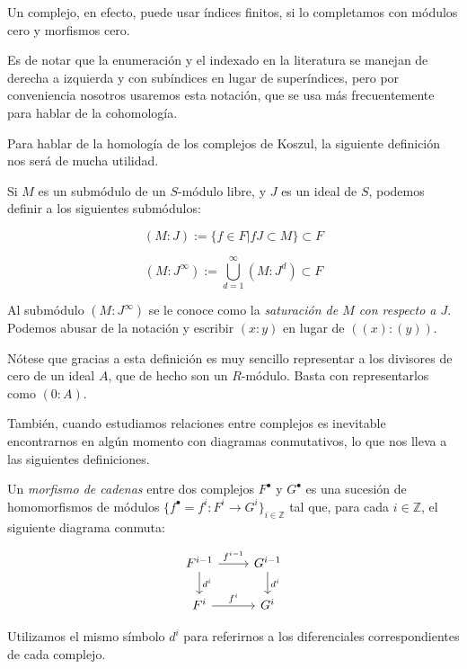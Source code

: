 Un complejo, en efecto, puede usar índices finitos, si lo completamos con módulos cero y morfismos cero.

Es de notar que la enumeración y el indexado en la literatura se manejan de derecha a izquierda y con subíndices en lugar de superíndices, pero por conveniencia nosotros usaremos esta notación, que se usa más frecuentemente para hablar de la cohomología.

Para hablar de la homología de los complejos de Koszul, la siguiente definición nos será de mucha utilidad.

\begin{definition}

Si $M$ es un submódulo de un $S$-módulo libre, y $J$ es un ideal de $S$, podemos definir a los siguientes submódulos:

$$(M:J) := \{f \in F|fJ\subset M\}\subset F$$

$$(M:J^\infty) := \bigcup_{d=1}^\infty(M:J^d)\subset F$$

Al submódulo $(M:J^\infty)$ se le conoce como la \emph{saturación de $M$ con respecto a $J$}. Podemos abusar de la notación y escribir $(x:y)$ en lugar de $((x):(y))$.

\end{definition}

Nótese que gracias a esta definición es muy sencillo representar a los divisores de cero de un ideal $A$, que de hecho son un $R$-módulo. Basta con representarlos como $(0:A)$.

También, cuando estudiamos relaciones entre complejos es inevitable encontrarnos en algún momento con diagramas conmutativos, lo que nos lleva a las siguientes definiciones.

\begin{definition}

Un \emph{morfismo de cadenas} entre dos complejos $F^{\bullet}$ y $G^{\bullet}$ es una sucesión de homomorfismos de módulos $\{f^{\bullet} = {f^i:F^i \rightarrow G^i}\}_{i \in \mathbb{Z}}$ tal que, para cada $i \in \mathbb{Z}$, el siguiente diagrama conmuta:

\[
\begin{tikzcd}
F^{i-1} \arrow[d,"d^i"] \arrow[r,"f^{i-1}"] & G^{i-1} \arrow[d,"d^i"]\\
F^i \arrow[r,"f^i"] & G^i
\end{tikzcd}
\]

Utilizamos el mismo símbolo $d^i$ para referirnos a los diferenciales correspondientes de cada complejo.

\end{definition}

